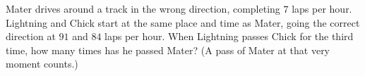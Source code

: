 Mater drives around a track in the wrong direction, completing $7$ laps per hour. Lightning and Chick start at the same place and time as Mater, going the correct direction at $91$ and $84$ laps per hour. When Lightning passes Chick for the third time, how many times has he passed Mater? (A pass of Mater at that very moment counts.)
